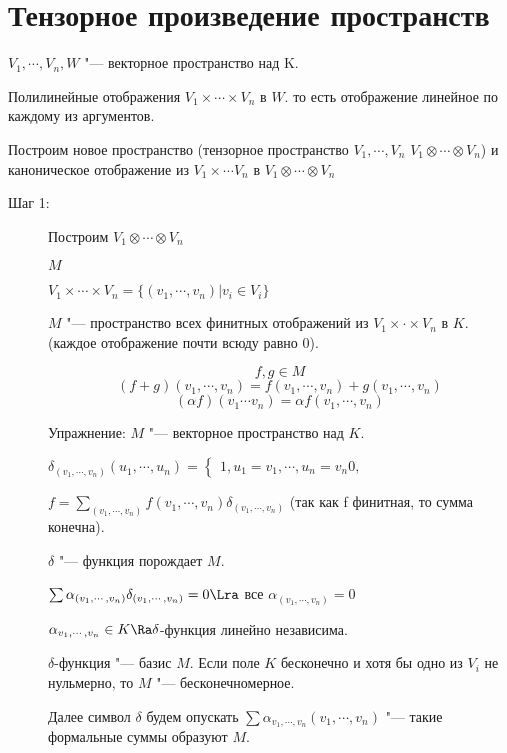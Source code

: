 ﻿\section{Тензорное произведение пространств}

$V_1, \cdots, V_n, W$ "--- векторное пространство над K.

Полилинейные отображения $V_1 \times \cdots \times V_n$ в $W$. 
то есть отображение линейное по каждому из аргументов. 

Построим новое пространство (тензорное пространство $V_1, \cdots, V_n$ $V_1 \otimes \cdots \otimes V_n$)  
и каноническое отображение из $V_1 \times \cdots V_n$ в $V_1 \otimes \cdots \otimes V_n$

\begin{description}
    \item[Шаг 1:]
    Построим $V_1 \otimes \cdots \otimes V_n$

    $M$

    $V_1 \times \cdots \times V_n = \{(v_1, \cdots, v_n)| v_i \in V_i\}$

    $M$ "--- пространство всех финитных отображений из $V_1 \times \cdot \times V_n$ в $K$.
    (каждое отображение почти всюду равно 0).

    $$f, g \in M$$
    $$(f + g)(v_1, \cdots, v_n) = f(v_1, \cdots, v_n) + g(v_1, \cdots, v_n)$$
    $$(\alpha f)(v_1 \cdots v_n) = \alpha f(v_1, \cdots, v_n)$$

    Упражнение: $M$ "--- векторное пространство над $K$.

    $\delta_{(v_1,\cdots, v_n)}(u_1, \cdots, u_n) = \left\{
    \begin{aligned}
    1, u_1 = v_1, \cdots, u_n = v_n
    0, 
    \end{aligned}
    \right.$

    $f = \sum_{(v_1, \cdots, v_n)} f(v_1, \cdots, v_n)\delta_{(v_1, \cdots, v_n)}$ 
    (так как f финитная, то сумма конечна). 

    $\delta$ "--- функция порождает $M$.

    $\sum \alpha_{(v_1, \cdots, v_n)} \delta_{(v_1, \cdots, v_n)} = 0 \Lra$  все $\alpha_{(v_1, \cdots, v_n)} = 0$ 

    $\alpha_{v_1, \cdots, v_n} \in K \Ra \delta$-функция линейно независима. 

    $\delta$-функция "--- базис $M$.
    Если поле $K$ бесконечно и хотя бы одно из $V_i$ не нульмерно, то 
    $M$ "--- бесконечномерное. 
    
    Далее символ $\delta$ будем опускать $\sum \alpha_{v_1, \cdots, v_n}(v_1, \cdots, v_n)$ "--- такие формальные суммы образуют $M$.


\end{description}
